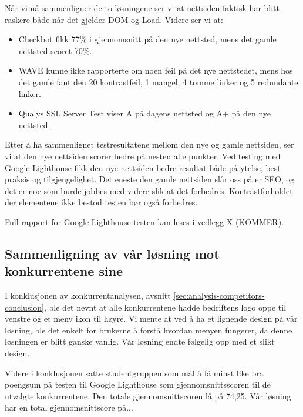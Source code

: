 Når vi nå sammenligner de to løsningene ser vi at nettsiden faktisk har blitt raskere både når det gjelder DOM og Load. Videre ser vi at:

\begin{itemize}
\item Checkbot fikk 77\% i gjennomsnitt på den nye nettsted, mens det gamle nettsted scoret 70\%. 
\item WAVE kunne ikke rapporterte om noen feil på det nye nettstedet, mens hos det gamle fant den 20 kontrastfeil, 1 mangel, 4 tomme linker og 5 redundante linker.
\item Qualys SSL Server Test viser A på dagens nettsted og A+ på den nye nettsted.
\end{itemize}

Etter å ha sammenlignet testresultatene mellom den nye og gamle nettsiden, ser vi at den nye nettsiden scorer bedre på nesten alle punkter. Ved testing med Google Lighthouse fikk den nye nettsiden bedre resultat både på ytelse, best praksis og tilgjengelighet. Det eneste den gamle nettsiden slår oss på er SEO, og det er noe som burde jobbes med videre slik at det forbedres. Kontrastforholdet der elementene ikke bestod testen bør også forbedres.

Full rapport for Google Lighthouse testen kan leses i vedlegg X (KOMMER).

\subsection{Sammenligning av vår løsning mot konkurrentene sine}
I konklusjonen av konkurrentanalysen, avsnitt \ref{sec:analysis-competitors-conclusion}, ble det nevnt at alle konkurrentene hadde bedriftens logo oppe til venstre og et meny ikon til høyre. Vi mente at ved å ha et lignende design på vår løsning, ble det enkelt for brukerne å forstå hvordan menyen fungerer, da denne løsningen er blitt ganske vanlig. Vår løsning endte følgelig opp med et slikt design.

Videre i konklusjonen satte studentgruppen som mål å få minst like bra poengsum på testen til Google Lighthouse som gjennomsnittsscoren til de utvalgte konkurrentene. Den totale gjennomsnittscoren lå på 74,25. Vår løsning har en total gjennomsnittscore på... 



